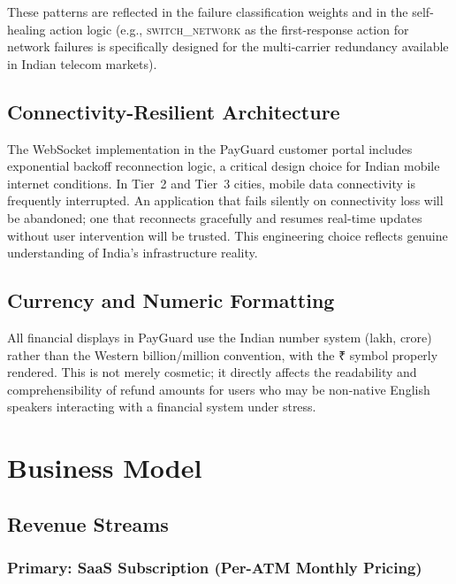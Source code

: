 \documentclass[12pt,a4paper]{article}
\newcommand{\inr}{₹}
\begin{document}
These patterns are reflected in the failure classification weights and in the self-healing
action logic (e.g., \textsc{switch\_network} as the first-response action for network
failures is specifically designed for the multi-carrier redundancy available in Indian
telecom markets).

\subsection{Connectivity-Resilient Architecture}

The WebSocket implementation in the PayGuard customer portal includes exponential backoff
reconnection logic, a critical design choice for Indian mobile internet conditions. In Tier~2
and Tier~3 cities, mobile data connectivity is frequently interrupted. An application that
fails silently on connectivity loss will be abandoned; one that reconnects gracefully and
resumes real-time updates without user intervention will be trusted. This engineering choice
reflects genuine understanding of India's infrastructure reality.

\subsection{Currency and Numeric Formatting}

All financial displays in PayGuard use the Indian number system (lakh, crore) rather than
the Western billion/million convention, with the \inr{} symbol properly rendered.
This is not merely cosmetic; it directly affects the readability and comprehensibility
of refund amounts for users who may be non-native English speakers interacting with a
financial system under stress.

\newpage

\section{Business Model}

\subsection{Revenue Streams}

\subsubsection{Primary: SaaS Subscription (Per-ATM Monthly Pricing)}
\end{document}
